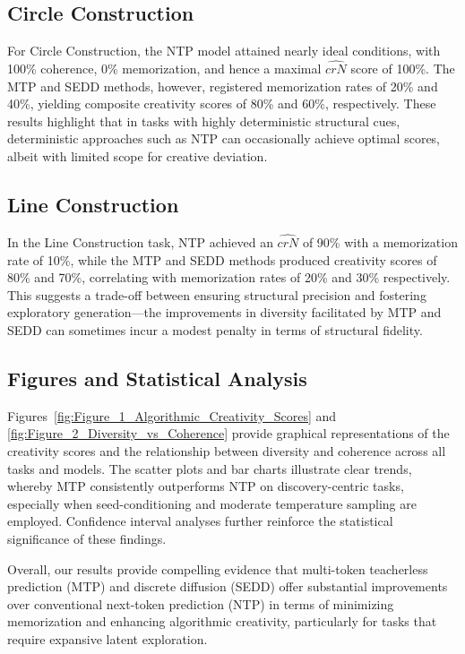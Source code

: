 \documentclass[12pt]{article}
\begin{document}
\subsection*{Circle Construction}
For Circle Construction, the NTP model attained nearly ideal conditions, with 100\% coherence, 0\% memorization, and hence a maximal \(\hat{crN}\) score of 100\%. The MTP and SEDD methods, however, registered memorization rates of 20\% and 40\%, yielding composite creativity scores of 80\% and 60\%, respectively. These results highlight that in tasks with highly deterministic structural cues, deterministic approaches such as NTP can occasionally achieve optimal scores, albeit with limited scope for creative deviation.

\subsection*{Line Construction}
In the Line Construction task, NTP achieved an \(\hat{crN}\) of 90\% with a memorization rate of 10\%, while the MTP and SEDD methods produced creativity scores of 80\% and 70\%, correlating with memorization rates of 20\% and 30\% respectively. This suggests a trade-off between ensuring structural precision and fostering exploratory generation—the improvements in diversity facilitated by MTP and SEDD can sometimes incur a modest penalty in terms of structural fidelity.

\subsection*{Figures and Statistical Analysis}
Figures~\ref{fig:Figure_1_Algorithmic_Creativity_Scores} and \ref{fig:Figure_2_Diversity_vs_Coherence} provide graphical representations of the creativity scores and the relationship between diversity and coherence across all tasks and models. The scatter plots and bar charts illustrate clear trends, whereby MTP consistently outperforms NTP on discovery-centric tasks, especially when seed-conditioning and moderate temperature sampling are employed. Confidence interval analyses further reinforce the statistical significance of these findings.

Overall, our results provide compelling evidence that multi-token teacherless prediction (MTP) and discrete diffusion (SEDD) offer substantial improvements over conventional next-token prediction (NTP) in terms of minimizing memorization and enhancing algorithmic creativity, particularly for tasks that require expansive latent exploration.
\end{document}
